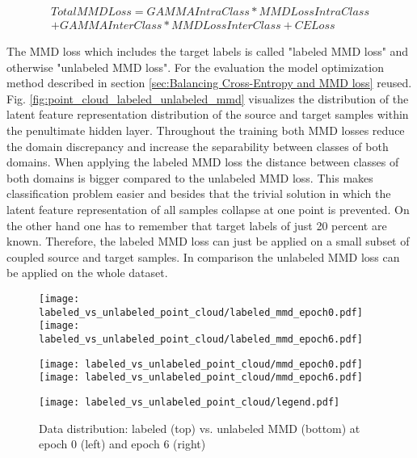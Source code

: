 \begin{equation}
\begin{split}
    TotalMMDLoss = GAMMAIntraClass * MMDLossIntraClass\\ + GAMMAInterClass * MMDLossInterClass + CELoss
\end{split}
\end{equation}

 The MMD loss which includes the target labels is called "labeled MMD loss" and otherwise "unlabeled MMD loss". For the evaluation the model optimization method described in section \ref{sec:Balancing Cross-Entropy and MMD loss} reused. Fig. \ref{fig:point_cloud_labeled_unlabeled_mmd} visualizes the distribution of the latent feature representation distribution of the source and target samples within the penultimate hidden layer. Throughout the training both MMD losses reduce the domain discrepancy and increase the separability between classes of both domains. When applying the labeled MMD loss the distance between classes of both domains is bigger compared to the unlabeled MMD loss. This makes classification problem easier and besides that the trivial solution in which the latent feature representation of all samples collapse at one point is prevented. On the other hand one has to remember that target labels of just 20 percent are known. Therefore, the labeled MMD loss can just be applied on a small subset of coupled source and target samples. In comparison the unlabeled MMD loss can be applied on the whole dataset.




\begin{figure}[p]
  \centering
  \texttt{[image: labeled\_vs\_unlabeled\_point\_cloud/labeled\_mmd\_epoch0.pdf]}
  \hspace{.3cm}
  \texttt{[image: labeled\_vs\_unlabeled\_point\_cloud/labeled\_mmd\_epoch6.pdf]}

  \vspace{.1cm}

  \texttt{[image: labeled\_vs\_unlabeled\_point\_cloud/mmd\_epoch0.pdf]}
  \hspace{.1cm}
  \texttt{[image: labeled\_vs\_unlabeled\_point\_cloud/mmd\_epoch6.pdf]}

  \vspace{.1cm}
  
  \texttt{[image: labeled\_vs\_unlabeled\_point\_cloud/legend.pdf]}


  \caption{Data distribution: labeled (top) vs. unlabeled MMD (bottom) at epoch 0 (left) and epoch 6 (right)}
  \label{fig:learning_curves_influence_mmd_feature_extractor}
\end{figure}
\FloatBarrier 


